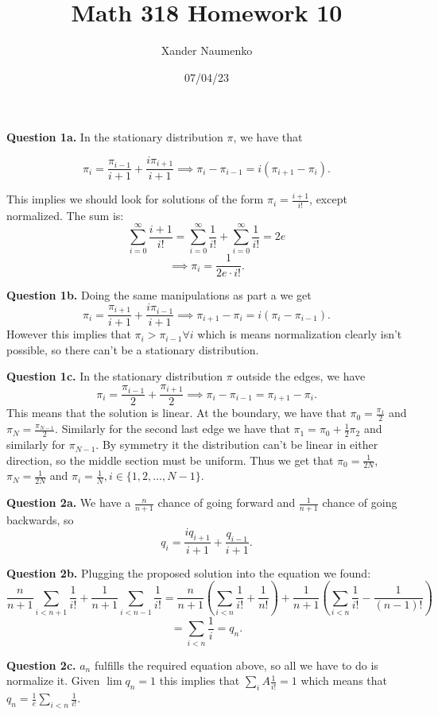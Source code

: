 \documentclass[letterpaper, reqno,11pt]{article}
\begin{document}
\title{Math 318 Homework 10}
\date{07/04/23}
\author{Xander Naumenko}
\maketitle

{\medskip\noindent\bf Question 1a.} In the stationary distribution $\pi$, we have that 

\[
    \pi_i = \frac{\pi_{i-1}}{i+1}+\frac{i\pi_{i+1}}{i+1}\implies \pi_i-\pi_{i-1}=i(\pi_{i+1}-\pi_i)
.\]

This implies we should look for solutions of the form $\pi_i=\frac{i+1}{i!}$, except normalized. The sum is: 
\[
\sum_{i=0}^{\infty}\frac{i+1}{i!}=\sum_{i=0}^{\infty}\frac{1}{i!}+\sum_{i=0}^{\infty}\frac{1}{i!}=2e
\]
\[
    \implies \pi_i=\frac{1}{2e\cdot i!}
.\]

{\medskip\noindent\bf Question 1b.} Doing the same manipulations as part a we get 
\[
    \pi_i = \frac{\pi_{i+1}}{i+1}+\frac{i\pi_{i-1}}{i+1}\implies \pi_{i+1}-\pi_i=i(\pi_i-\pi_{i-1})
.\]
However this implies that $\pi_i>\pi_{i-1}\forall i$ which is means normalization clearly isn't possible, so there can't be a stationary distribution.

{\medskip\noindent\bf Question 1c.} In the stationary distribution $\pi$ outside the edges, we have
\[
    \pi_i=\frac{\pi_{i-1}}{2}+\frac{\pi_{i+1}}{2}\implies\pi_i-\pi_{i-1}=\pi_{i+1}-\pi_i
.\]
This means that the solution is linear. At the boundary, we have that $\pi_0=\frac{\pi_1}{2}$ and $\pi_N=\frac{\pi_{N-1}}{2}$. Similarly for the second last edge we have that $\pi_1=\pi_0+\frac{1}{2}\pi_2$ and similarly for $\pi_{N-1}$. By symmetry it the distribution can't be linear in either direction, so the middle section must be uniform. Thus we get that $\pi_{0}=\frac{1}{2N}$, $\pi_N=\frac{1}{2N}$ and $\pi_{i}=\frac{1}{N}, i\in \{1, 2, \ldots, N-1\} $.

{\medskip\noindent\bf Question 2a.} We have a $\frac{n}{n+1}$ chance of going forward and $\frac{1}{n+1}$ chance of going backwards, so
\[
    q_i=\frac{iq_{i+1}}{i+1}+\frac{q_{i-1}}{i+1}
.\]

{\medskip\noindent\bf Question 2b.} Plugging the proposed solution into the equation we found:
\[
    \frac{n}{n+1}\sum_{i<n+1}\frac{1}{i!}+\frac{1}{n+1}\sum_{i<n-1}\frac{1}{i!}=\frac{n}{n+1}\left(\sum_{i<n}\frac{1}{i!}+\frac{1}{n!}\right)+\frac{1}{n+1}\left(\sum_{i<n}\frac{1}{i!}-\frac{1}{(n-1)!}\right)
\]
\[
    =\sum_{i<n}\frac{1}{i}=q_n
.\]

{\medskip\noindent\bf Question 2c.} $a_n$ fulfills the required equation above, so all we have to do is normalize it. Given $\lim q_n=1$ this implies that $\sum_i A\frac{1}{i!}=1$ which means that $q_n=\frac{1}{e}\sum_{i<n}\frac{1}{i!}$.
\end{document}
